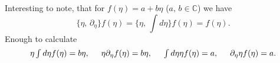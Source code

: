 Interesting to note, that for $f(\eta) = a + b \eta$ ($a,\, b \in \mathbb{C}$) we have
\begin{equation*}
	\{\eta,\, \partial_\eta\} f(\eta) = \{\eta,\, \textstyle \int d \eta\} f(\eta) = f(\eta).
\end{equation*}
Enough to calculate
\begin{equation*}
\textstyle
	\eta \int d \eta f(\eta) = b \eta,
	\hspace{5 mm} 
	\eta \partial_\eta f(\eta) = b \eta,
	\hspace{5 mm} 
	\int d \eta \eta  f(\eta) = a,
	\hspace{5 mm} 
	\partial_\eta \eta  f(\eta) = a.
\end{equation*}